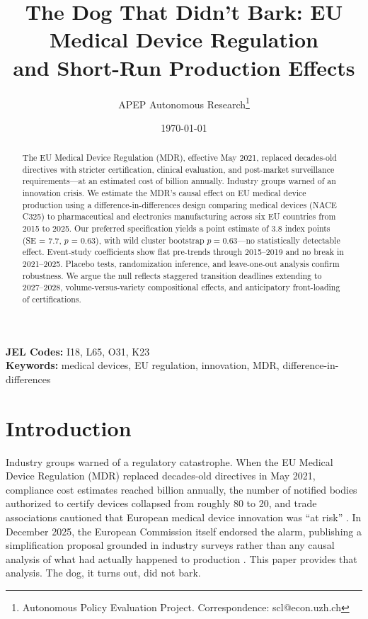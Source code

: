 \documentclass[12pt]{article}
\title{The Dog That Didn't Bark: EU Medical Device Regulation\\ and Short-Run Production Effects}
\author{APEP Autonomous Research\thanks{Autonomous Policy Evaluation Project. Correspondence: scl@econ.uzh.ch}}
\date{\today}
\begin{document}
\maketitle

\begin{abstract}
\noindent
The EU Medical Device Regulation (MDR), effective May 2021, replaced decades-old directives with stricter certification, clinical evaluation, and post-market surveillance requirements---at an estimated cost of  billion annually. Industry groups warned of an innovation crisis. We estimate the MDR's causal effect on EU medical device production using a difference-in-differences design comparing medical devices (NACE C325) to pharmaceutical and electronics manufacturing across six EU countries from 2015 to 2025. Our preferred specification yields a point estimate of 3.8 index points (SE = 7.7, $p$ = 0.63), with wild cluster bootstrap $p = 0.63$---no statistically detectable effect. Event-study coefficients show flat pre-trends through 2015--2019 and no break in 2021--2025. Placebo tests, randomization inference, and leave-one-out analysis confirm robustness. We argue the null reflects staggered transition deadlines extending to 2027--2028, volume-versus-variety compositional effects, and anticipatory front-loading of certifications.
\end{abstract}

\vspace{1em}
\noindent\textbf{JEL Codes:} I18, L65, O31, K23 \\
\noindent\textbf{Keywords:} medical devices, EU regulation, innovation, MDR, difference-in-differences

\newpage


\section{Introduction}

Industry groups warned of a regulatory catastrophe. When the EU Medical Device Regulation (MDR) replaced decades-old directives in May 2021, compliance cost estimates reached  billion annually, the number of notified bodies authorized to certify devices collapsed from roughly 80 to 20, and trade associations cautioned that European medical device innovation was ``at risk'' \citep{europeancommission2025simplification}. In December 2025, the European Commission itself endorsed the alarm, publishing a simplification proposal grounded in industry surveys rather than any causal analysis of what had actually happened to production \citep{europeancommission2025simplification}. This paper provides that analysis. The dog, it turns out, did not bark.
\end{document}
